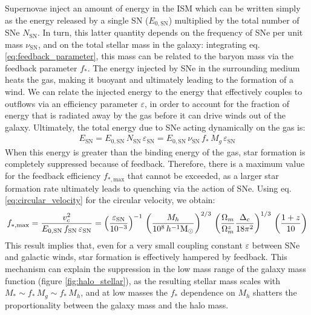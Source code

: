   Supernovae inject an amount of energy in the ISM which can be written simply as the energy released by a single SN ($E_{0,\mathrm{SN}}$) multiplied by the total number of SNe $N_\mathrm{SN}$. In turn, this latter quantity depends on the frequency of SNe per unit mass $\nu_\mathrm{SN}$, and on the total stellar mass in the galaxy: integrating eq. \ref{eq:feedback_parameter}, this mass can be related to the baryon mass via the feedback parameter $f_*$. The energy injected by SNe in the surrounding medium heats the gas, making it buoyant and ultimately leading to the formation of a wind. We can relate the injected energy to the energy that effectively couples to outflows via an efficiency parameter $\varepsilon$, in order to account for the fraction of energy that is radiated away by the gas before it can drive winds out of the galaxy. Ultimately, the total energy due to SNe acting dynamically on the gas is: 
  \begin{align}
   E_\mathrm{SN} =  E_{0,\mathrm{SN}} \,N_\mathrm{SN} \, \varepsilon_\mathrm{SN} = E_{0,\mathrm{SN}}\,\nu_\mathrm{SN}\, f_*\,M_g\,\varepsilon_\mathrm{SN}
  \end{align}
  When this energy is greater than the binding energy of the gas, star formation is completely suppressed because of feedback. Therefore, there is a maximum value for the feedback efficiency $f_{*,\mathrm{max}}$ that cannot be exceeded, as a larger star formation rate ultimately leads to quenching via the action of SNe. Using eq. \ref{eq:circular_velocity} for the circular velocity, we obtain:
  \begin{align}
    f_{*,\mathrm{max}} = \frac{v_c^2}{E_{0,\mathrm{SN}}\,f_\mathrm{SN}\,\varepsilon_\mathrm{SN}} = \left(\frac{\varepsilon_\mathrm{SN}}{10^{-3}}\right)^{-1}\,\left(\frac{M_h}{10^8\,h^{-1}{\rm M}_{\odot}}\right)^{2/3}\,\left(\frac{\Omega_m}{\Omega^z_m}\frac{\Delta_c}{18\pi^2}\right)^{1/3}\,\left(\frac{1+z}{10}\right)
  \end{align}
  This result implies that, even for a very small coupling constant $\varepsilon$ between SNe and galactic winds, star formation is effectively hampered by feedback. This mechanism can explain the suppression in the low mass range of the galaxy mass function (figure \ref{fig:halo_stellar}), as the resulting stellar mass scales with $M_* \sim f_* \,M_g \sim f_* \,M_h$, and at low masses the $f_*$ dependence on $M_h$ shatters the proportionality between the galaxy mass and the halo mass. 
  
